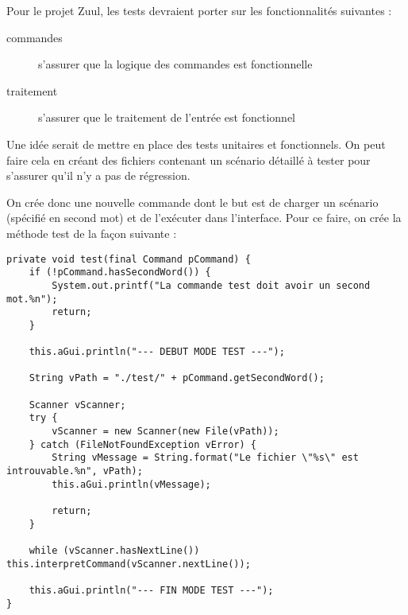 \begin{exercise}[subtitle=Réflexion sur les tests]

Pour le projet Zuul, les tests devraient porter sur les fonctionnalités suivantes :

\begin{description}
  \item [commandes] s'assurer que la logique des commandes est fonctionnelle
  \item [traitement] s'assurer que le traitement de l'entrée est fonctionnel
\end{description}
\end{exercise}

\begin{exercise}[subtitle=Fonctionnement des tests]

Une idée serait de mettre en place des tests unitaires et fonctionnels. On peut faire cela en créant des fichiers contenant un scénario détaillé à tester pour s'assurer qu'il n'y a pas de régression.

On crée donc une nouvelle commande  dont le but est de charger un scénario (spécifié en second mot) et de l'exécuter dans l'interface. Pour ce faire, on crée la méthode test de la façon suivante :

\begin{verbatim}
private void test(final Command pCommand) {
    if (!pCommand.hasSecondWord()) {
        System.out.printf("La commande test doit avoir un second mot.%n");
        return;
    }

    this.aGui.println("--- DEBUT MODE TEST ---");

    String vPath = "./test/" + pCommand.getSecondWord();

    Scanner vScanner;
    try {
        vScanner = new Scanner(new File(vPath));
    } catch (FileNotFoundException vError) {
        String vMessage = String.format("Le fichier \"%s\" est introuvable.%n", vPath);
        this.aGui.println(vMessage);

        return;
    }

    while (vScanner.hasNextLine()) this.interpretCommand(vScanner.nextLine());

    this.aGui.println("--- FIN MODE TEST ---");
}
\end{verbatim}
\end{exercise}

